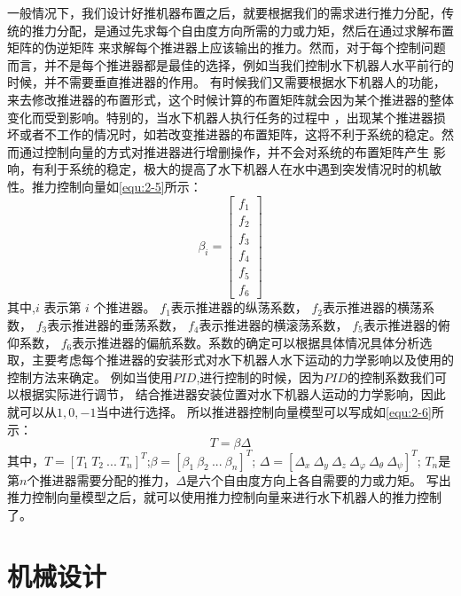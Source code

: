一般情况下，我们设计好推机器布置之后，就要根据我们的需求进行推力分配，传统的推力分配，是通过先求每个自由度方向所需的力或力矩，然后在通过求解布置矩阵的伪逆矩阵
来求解每个推进器上应该输出的推力。然而，对于每个控制问题而言，并不是每个推进器都是最佳的选择，例如当我们控制水下机器人水平前行的时候，并不需要垂直推进器的作用。
有时候我们又需要根据水下机器人的功能，来去修改推进器的布置形式，这个时候计算的布置矩阵就会因为某个推进器的整体变化而受到影响。特别的，当水下机器人执行任务的过程中
，出现某个推进器损坏或者不工作的情况时，如若改变推进器的布置矩阵，这将不利于系统的稳定。然而通过控制向量的方式对推进器进行增删操作，并不会对系统的布置矩阵产生
影响，有利于系统的稳定，极大的提高了水下机器人在水中遇到突发情况时的机敏性。推力控制向量如\autoref{equ:2-5}所示：
\begin{equation}
    \label{equ:2-5}
    {\beta}_i =  \left[ {\begin{array}{*{20}{c}}
        {f_1}\\
        {f_2}\\
        f_3\\
        f_4\\
        f_5\\
        f_6
        \end{array}} \right]
\end{equation}
其中,$i$ 表示第 $i$ 个推进器。  ${f_1}$表示推进器的纵荡系数，
${f_2}$表示推进器的横荡系数，
$f_3$表示推进器的垂荡系数，
$f_4$表示推进器的横滚荡系数，
$f_5$表示推进器的俯仰系数，
$f_6$表示推进器的偏航系数。系数的确定可以根据具体情况具体分析选取，主要考虑每个推进器的安装形式对水下机器人水下运动的力学影响以及使用的控制方法来确定。
例如当使用$PID$,进行控制的时候，因为$PID$的控制系数我们可以根据实际进行调节，
结合推进器安装位置对水下机器人运动的力学影响，因此就可以从$1,0,-1$当中进行选择。
所以推进器控制向量模型可以写成如\autoref{equ:2-6}所示：
\begin{equation}
    \label{equ:2-6}
    T = \beta \Delta 
\end{equation}
   其中，$T  = [T_1 \ T_2 \ ... \ T_n]^T$;$\beta = [{\beta }_1\  {\beta }_2 \ ...\ {\beta }_n ]^T$;
   $\Delta  = [{\Delta }_x \ {\Delta }_y \ {\Delta }_z \ {\Delta }_\varphi \  {\Delta }_\theta \  {\Delta }_\psi ]^T$;
   $T_n$是第$n$个推进器需要分配的推力，$\Delta$是六个自由度方向上各自需要的力或力矩。
写出推力控制向量模型之后，就可以使用推力控制向量来进行水下机器人的推力控制了。



\section{机械设计}


